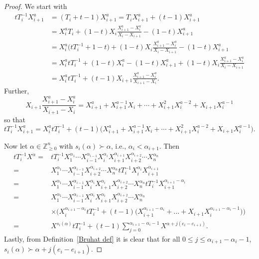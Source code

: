 \documentclass[10pt,a4paper]{amsart}
\numberwithin{equation}{section}
\theoremstyle{definition}
\begin{document}
\begin{proof}
We start with
 \begin{align*}
 tT_i^{-1}X_{i+1}^{a}&= (T_i+t-1)X_{i+1}^a = T_iX_{i+1}^{a} + (t-1)X_{i+1}^a \\
 &= X_i^{a}T_i + (1-t)X_i\frac{X_{i+1}^{a}-X_i^{a}}{X_i-X_{i+1}} -(1-t)X_{i+1}^{a} \\
 & = X_i^a\bigl(tT_i^{-1}+1-t\bigr) + (1-t)X_i\frac{X_{i+1}^a - X_i^a}{X_i-X_{i+1}} -(1-t)X_{i+1}^{a} \\
 & = X_i^{a}tT_i^{-1} + (1-t)X_i^{a} -(1-t)X_{i+1}^{a} + (1-t)X_i\frac{X_{i+1}^{a}-X_i^{a}}{X_i-X_{i+1}}\\
 &= X_i^{a}tT_i^{-1} + (t-1)X_{i+1}\frac{X_{i+1}^{a}-X_i^{a}}{X_{i+1}-X_i}.
 \end{align*}
Further,
\[
 X_{i+1}\frac{X_{i+1}^{a}-X_i^{a}}{X_{i+1}-X_i} = X_{i+1}^{a} + X_{i+1}^{a-1}X_i + \cdots + X_{i+1}^2X_i^{a-2} + X_{i+1}X_i^{a-1}
\]
 so that
\[
 tT_i^{-1}X_{i+1}^{a} = X_i^{a}tT_i^{-1} + (t-1)\bigl(X_{i+1}^{a} + X_{i+1}^{a-1}X_i + \cdots + X_{i+1}^2X_i^{a-2} + X_{i+1}X_i^{a-1}\bigr).
\]


Now let $\alpha \in \mathbb{Z}_{\geq 0}^{n}$ with $s_i(\alpha) \succ \alpha$, i.e., $\alpha_i < \alpha_{i+1}$.
Then
\begin{align*}
 tT_i^{-1}X^{\alpha} ={}& tT_i^{-1}X_1^{\alpha_1}\cdots X_{i-1}^{\alpha_{i-1}}X_i^{\alpha_i}X_{i+1}^{\alpha_{i+1}}X_{i+2}^{\alpha_{i+2}}\cdots X_n^{\alpha_n} \\
 ={}& X_1^{\alpha_1}\cdots X_{i-1}^{\alpha_{i-1}}X_{i+2}^{\alpha_{i+2}}\cdots X_n^{\alpha_n} tT_i^{-1}X_i^{\alpha_i}X_{i+1}^{\alpha_{i+1}} \\
 ={}& X_1^{\alpha_1}\cdots X_{i-1}^{\alpha_{i-1}}X_i^{\alpha_i}X_{i+1}^{\alpha_{i}}X_{i+2}^{\alpha_{i+2}}\cdots X_n^{\alpha_n} tT_i^{-1}X_{i+1}^{\alpha_{i+1}-\alpha_{i}} \\
 ={}& X_1^{\alpha_1}\cdots X_{i-1}^{\alpha_{i-1}}X_i^{\alpha_i}X_{i+1}^{\alpha_{i}}X_{i+2}^{\alpha_{i+2}}\cdots X_n^{\alpha_n} \\
 & \times \bigl( X_i^{\alpha_{i+1}-\alpha_i}tT_i^{-1} + (t-1)\bigl( X_{i+1}^{\alpha_{i+1}-\alpha_i} + \dots + X_{i+1}X_i^{\alpha_{i+1}-\alpha_i-1}\bigr) \bigr) \\
 ={}& X^{s_i(\alpha)}tT_i^{-1} + (t-1)\sum_{j=0}^{\alpha_{i+1}-\alpha_i-1} X^{\alpha + j(e_i - e_{i+1})}.
\end{align*}
 Lastly, from Definition~\ref{Bruhat def} it is clear that for all $0 \leq j \leq \alpha_{i+1}-\alpha_i-1$, $s_i(\alpha) \succ \alpha + j(e_i - e_{i+1})$.
\end{proof}
\end{document}
